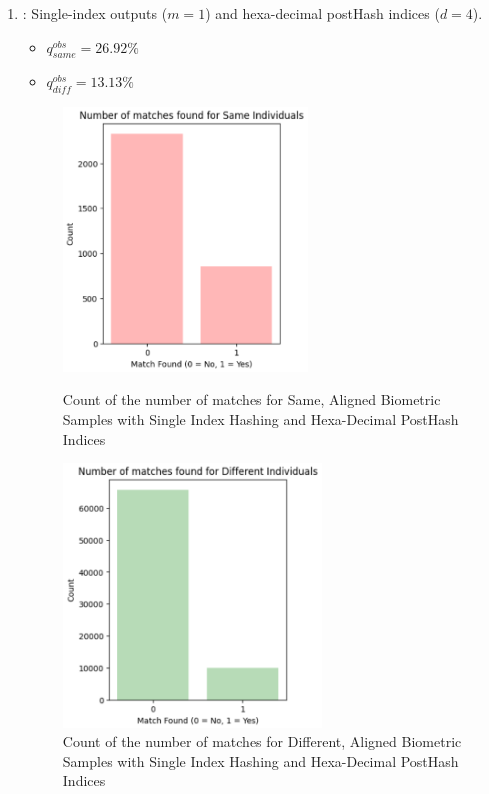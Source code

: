 \begin{enumerate}
    \item {}: Single-index outputs (\(m=1\)) and hexa-decimal postHash indices (\(d=4\)).
    \begin{itemize}
        \item \(q_{same}^{obs} = 26.92\%\)
        \item \(q_{diff}^{obs} = 13.13\%\)
    \end{itemize}

    \begin{figure}[H]
        \centering
        \begin{minipage}[b]{0.48\linewidth}
            \centering
            \includegraphics[width=\linewidth,height=7cm,keepaspectratio]{latex-img/d4same.png}
            \caption{Count of the number of matches for Same, Aligned Biometric Samples with Single Index Hashing and Hexa-Decimal PostHash Indices}
            \label{mu_same}
        \end{minipage}
        \hfill
        \begin{minipage}[b]{0.48\linewidth}
            \centering
            \includegraphics[width=\linewidth,height=7cm,keepaspectratio]{latex-img/d4diff.png}
            \caption{Count of the number of matches for Different, Aligned Biometric Samples with Single Index Hashing and Hexa-Decimal PostHash Indices}
            \label{mu_diff}
        \end{minipage}
    \end{figure}
\end{enumerate}

